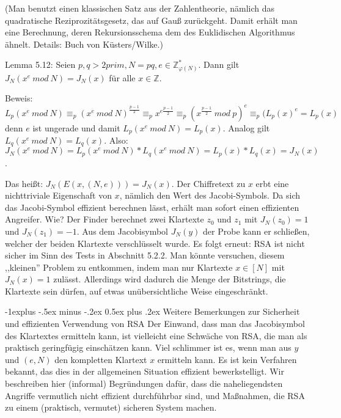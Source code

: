 \documentclass[a4paper]{article}
\makeatletter
\renewcommand{\subsection}{\@startsection{subsection}{2}{0mm}%
 {-1explus -.5ex minus -.2ex}%
 {0.5ex plus .2ex}%
 {\normalfont\normalsize\bfseries}}
\makeatother
\begin{document}
\begin{multicols}{3}
        (Man benutzt einen klassischen Satz aus der Zahlentheorie, nämlich das quadratische Reziprozitätsgesetz, das auf Gauß zurückgeht. Damit erhält man eine Berechnung, deren Rekursionsschema dem des Euklidischen Algorithmus ähnelt. Details: Buch von Küsters/Wilke.)

        Lemma 5.12: Seien $p,q >2 prim,N=pq,e\in\mathbb{Z}^*_{\varphi(N)}$. Dann gilt $J_N(x^e\ mod\ N) =J_N(x)$ für alle $x\in\mathbb{Z}$.

        Beweis: $L_p(x^e\ mod\ N)\equiv_p (x^e\ mod\ N)^{\frac{p-1}{2}} \equiv_p x^{e\frac{p-1}{2}} \equiv_p (x^{\frac{p-1}{2}}\ mod\ p)^e \equiv_p (L_p(x)^e =L_p(x)$
        denn $e$ ist ungerade und damit $L_p(x^e\ mod\ N) =L_p(x)$. Analog gilt $L_q(x^e\ mod\ N) =L_q(x)$.
        Also: $J_N(x^e\ mod\ N) =L_p(x^e\ mod\ N)*L_q(x^e\ mod\ N) =L_p(x)*L_q(x) =J_N(x)$.

        Das heißt: $J_N(E(x,(N,e))) =J_N(x)$. Der Chiffretext zu $x$ erbt eine nichttriviale Eigenschaft von $x$, nämlich den Wert des Jacobi-Symbols. Da sich das Jacobi-Symbol effizient berechnen lässt, erhält man sofort einen effizienten Angreifer. Wie? Der Finder berechnet zwei Klartexte $z_0$ und $z_1$ mit $J_N(z_0) = 1$ und $J_N(z_1) = -1$. Aus dem Jacobisymbol $J_N(y)$ der Probe kann er schließen, welcher der beiden Klartexte verschlüsselt wurde. Es folgt erneut: RSA ist nicht sicher im Sinn des Tests in Abschnitt 5.2.2.
        Man könnte versuchen, diesem ,,kleinen'' Problem zu entkommen, indem man nur Klartexte $x\in [N]$ mit $J_N(x) = 1$ zulässt. Allerdings wird dadurch die Menge der Bitstrings, die Klartexte sein dürfen, auf etwas unübersichtliche Weise eingeschränkt.


        \subsection{Weitere Bemerkungen zur Sicherheit und effizienten Verwendung von RSA}
        Der Einwand, dass man das Jacobisymbol des Klartextes ermitteln kann, ist vielleicht eine Schwäche von RSA, die man als praktisch geringfügig einschätzen kann. Viel schlimmer ist es, wenn man aus $y$ und $(e,N)$ den kompletten Klartext $x$ ermitteln kann. Es ist kein Verfahren bekannt, das dies in der allgemeinen Situation effizient bewerkstelligt. Wir beschreiben hier (informal) Begründungen dafür, dass die naheliegendsten Angriffe vermutlich nicht effizient durchführbar sind, und Maßnahmen, die RSA zu einem (praktisch, vermutet) sicheren System machen.


\end{multicols}
\end{document}
